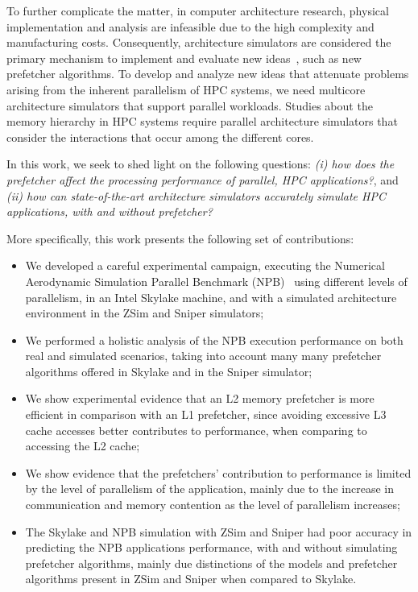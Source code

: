 \documentclass[AMA,final,STIX1COL]{WileyNJD-v2}
\newcommand{\ms}[1]{\textcolor{orange}{\bfseries \ul{ msserpa: #1} }\vspace{0.2cm}}
\newcommand{\fbm}[1]{\textcolor{red}{\bfseries \ul{fbm: #1} }\vspace{0.2cm}}
\begin{document}
To further complicate the matter, in computer architecture research, physical implementation and analysis are infeasible due to the high complexity and manufacturing costs. 
Consequently, architecture simulators are considered the primary mechanism to implement and evaluate new ideas~\cite{skadron2003challenges}, such as new prefetcher algorithms. 
To develop and analyze new ideas that attenuate problems arising from the inherent parallelism of HPC systems, we need multicore architecture simulators that support parallel workloads. 
Studies about the memory hierarchy in HPC systems require parallel architecture simulators that consider the interactions that occur among the different cores. %

In this work, we seek to shed light on the following questions: \textit{(i) how does the prefetcher affect the processing performance of parallel, HPC applications?}, and \textit{(ii) how can state-of-the-art architecture simulators accurately simulate HPC applications, with and without prefetcher?}

More specifically, this work presents the following set of contributions: %
\begin{itemize}
    \item We developed a careful experimental campaign, executing the Numerical Aerodynamic Simulation Parallel Benchmark (NPB)~\cite{jin1999openmp} using different levels of parallelism, in an Intel Skylake machine, and with a simulated architecture environment in the ZSim and Sniper simulators; 
    \item We performed a holistic analysis of the NPB execution performance on both real and simulated scenarios, taking into account many many prefetcher algorithms offered in Skylake and in the Sniper simulator;
    \item We show experimental evidence that an L2 memory prefetcher is more efficient in comparison with an L1 prefetcher, since avoiding excessive L3 cache accesses better contributes to performance, when comparing to accessing the L2 cache;
    \item We show evidence that the prefetchers' contribution to performance is limited by the level of parallelism of the application, mainly due to the increase in communication and memory contention as the level of parallelism increases;
    \item The Skylake and NPB simulation with ZSim and Sniper had poor accuracy in predicting the NPB applications performance, with and without simulating prefetcher algorithms, mainly due distinctions of the models and prefetcher algorithms present in ZSim and Sniper when compared to Skylake.
\end{itemize}
\end{document}
